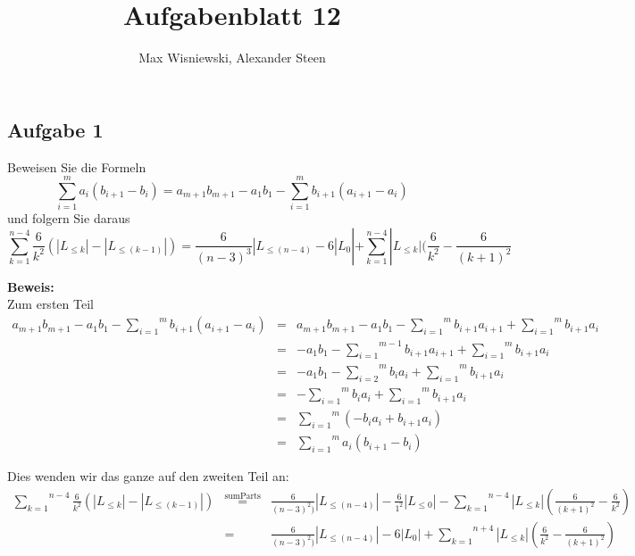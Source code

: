 \documentclass[11pt,a4paper,ngerman]{article}
\date{}
\title{Aufgabenblatt 12}
\author{Max Wisniewski, Alexander Steen}
\begin{document}

\renewcommand{\figurename}{Figur}

\maketitle
\thispagestyle{fancy}

\subsection*{Aufgabe 1}

Beweisen Sie die Formeln
$$
    \sum^{m}_{i=1} a_i (b_{i+1} - b_i) = a_{m+1}b_{m+1} - a_1b_1 - \sum^{m}_{i=1} b_{i+1} (a_{i+1} - a_i)
$$
und folgern Sie daraus
$$
    \sum^{n-4}_{k=1} \frac{6}{k^2} (|L_{\leq k}| - |L_{\leq (k-1)}|) = \frac{6}{(n-3)^3}|L_{\leq(n-4)} - 6 |L_0| + \sum^{n-4}_{k=1} |L_{\leq k}|(\frac{6}{k^2}-\frac{6}{(k+1)^2}
$$

\textbf{Beweis:}\\

Zum ersten Teil
\begin{equation*}\begin{array}{rcl}
    a_{m+1}b_{m+1} - a_1b_1 - \overset{m}{\underset{i=1}{\sum}} b_{i+1}(a_{i+1} - a_i)
        &=& a_{m+1}b_{m+1} - a_1b_1 - \overset{m}{\underset{i=1}{\sum}} b_{i+1}a_{i+1} + \overset{m}{\underset{i=1}{\sum}} b_{i+1}a_i\\
        &=& -a_1b_1 - \overset{m-1}{\underset{i=1}{\sum}} b_{i+1}a_{i+1} + \overset{m}{\underset{i=1}{\sum}} b_{i+1}a_i\\
        &=& -a_1b_1 - \overset{m}{\underset{i=2}{\sum}} b_ia_i + \overset{m}{\underset{i=1}{\sum}} b_{i+1}a_i\\
        &=& - \overset{m}{\underset{i=1}{\sum}} b_ia_i + \overset{m}{\underset{i=1}{\sum}} b_{i+1}a_i\\
        &=& \overset{m}{\underset{i=1}{\sum}} (- b_ia_i + b_{i+1}a_i)\\
        &=& \overset{m}{\underset{i=1}{\sum}} a_i(b_{i+1} - b_i)
\end{array}\end{equation*}

Dies wenden wir das ganze auf den zweiten Teil an:
\begin{equation*}\begin{array}{rcl}
    \overset{n-4}{\underset{k=1}{\sum}} \frac{6}{k^2} (|L_{\leq k}| - |L_{\leq (k-1)}|)
        &\stackrel{\text{sumParts}}{=}&
            \frac{6}{(n-3)^2)}|L_{\leq (n-4)}| - \frac{6}{1^2}|L_{\leq 0}| - \overset{n-4}{\underset{k=1}{\sum}}|L_{\leq k}|\left( \frac{6}{(k+1)^2} - \frac{6}{k^2} \right)\\
        &=& \frac{6}{(n-3)^2)}|L_{\leq (n-4)}| - 6|L_0| + \overset{n+4}{\underset{k=1}{\sum}}|L_{\leq k}| \left( \frac{6}{k^2} - \frac{6}{(k+1)^2}\right)
\end{array}\end{equation*}
\end{document}
